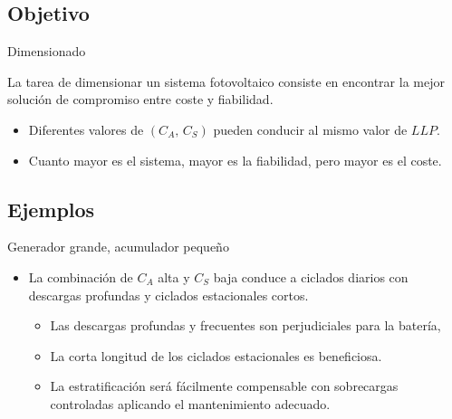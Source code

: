 \documentclass[xcolor={usenames,svgnames,dvipsnames}]{beamer}
\begin{document}
\subsection{Objetivo}
\label{sec:orgdc36600}
\begin{frame}[label={sec:org0ae340d}]{Dimensionado}
\begin{block}{La tarea de dimensionar un sistema fotovoltaico consiste en encontrar la mejor solución de compromiso entre coste y fiabilidad.}
\begin{itemize}
\item Diferentes valores de \((C_{A},\, C_{S})\) pueden conducir al mismo
valor de \(LLP\).

\item Cuanto mayor es el sistema, mayor es la fiabilidad, pero mayor es el
coste.
\end{itemize}
\end{block}
\end{frame}


\subsection{Ejemplos}
\label{sec:orge307d34}
\begin{frame}[label={sec:orgb07567a}]{Generador grande, acumulador pequeño}
\begin{itemize}
\item La \alert{combinación de \(C_{A}\) alta y \(C_{S}\) baja} conduce a ciclados
diarios con descargas profundas y ciclados estacionales
cortos.

\begin{itemize}
\item Las descargas profundas y frecuentes son perjudiciales para la
batería,

\item La corta longitud de los ciclados estacionales es beneficiosa.

\item La estratificación será fácilmente compensable con sobrecargas
controladas aplicando el mantenimiento adecuado.
\end{itemize}
\end{itemize}
\end{frame}
\end{document}

